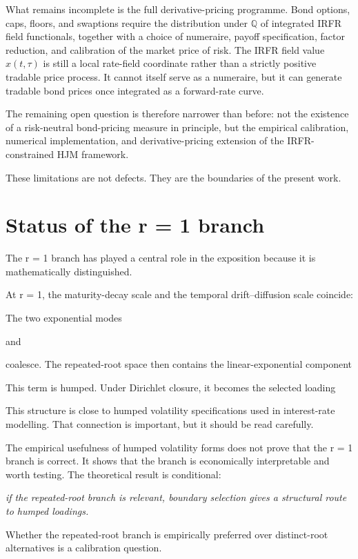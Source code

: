 \documentclass[11pt,oneside]{book}
\begin{document}
What remains incomplete is the full derivative-pricing programme. Bond
options, caps, floors, and swaptions require the distribution under
\(\mathbb Q\) of integrated IRFR field functionals, together with a
choice of numeraire, payoff specification, factor reduction, and
calibration of the market price of risk. The IRFR field value
\(x(t,\tau)\) is still a local rate-field coordinate rather than a
strictly positive tradable price process. It cannot itself serve as a
numeraire, but it can generate tradable bond prices once integrated as a
forward-rate curve.

The remaining open question is therefore narrower than before: not the
existence of a risk-neutral bond-pricing measure in principle, but the
empirical calibration, numerical implementation, and derivative-pricing
extension of the IRFR-constrained HJM framework.

These limitations are not defects. They are the boundaries of the
present work.

\section{Status of the r = 1
branch}\label{status-of-the-r-1-branch}

The r = 1 branch has played a central role in the exposition because it
is mathematically distinguished.

At r = 1, the maturity-decay scale and the temporal drift--diffusion
scale coincide:

The two exponential modes

and

coalesce. The repeated-root space then contains the linear-exponential
component

This term is humped. Under Dirichlet closure, it becomes the selected
loading

This structure is close to humped volatility specifications used in
interest-rate modelling. That connection is important, but it should be
read carefully.

The empirical usefulness of humped volatility forms does not prove that
the r = 1 branch is correct. It shows that the branch is economically
interpretable and worth testing. The theoretical result is conditional:

\emph{if the repeated-root branch is relevant, boundary selection gives
a structural route to humped loadings.}

Whether the repeated-root branch is empirically preferred over
distinct-root alternatives is a calibration question.
\end{document}
